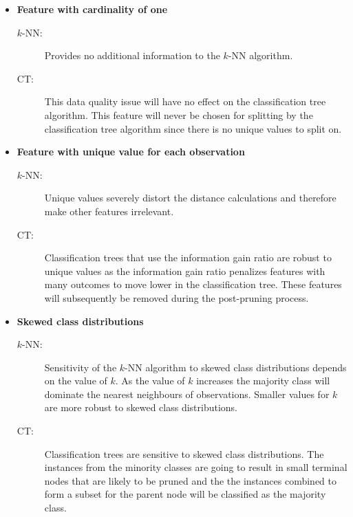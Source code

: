 \documentclass[conference]{IEEEtran}
\begin{document}
\begin{itemize}
		\item \textbf{Feature with cardinality of one}  
		\begin{description}
			\item [$k$-NN:] Provides no additional information to the $k$-NN algorithm.
			\item [CT:] This data quality issue will have no effect on the classification tree algorithm. This feature will never be chosen for splitting by the classification tree algorithm since there is no unique values to split on.
		\end{description}
		
		\item \textbf{Feature with unique value for each observation}  
		\begin{description}
			\item [$k$-NN:] Unique values severely distort the distance calculations and therefore make other features irrelevant.
			\item [CT:] Classification trees that use the information gain ratio are robust to unique values as the information gain ratio penalizes features with many outcomes to move lower in the classification tree. These features will subsequently be removed during the post-pruning process.
		\end{description}
		
		\item \textbf{Skewed class distributions}  
		\begin{description}
			\item [$k$-NN:] Sensitivity of the $k$-NN algorithm to skewed class distributions depends on the value of $k$. As the value of $k$ increases the majority class will dominate the nearest neighbours of observations. Smaller values for $k$ are more robust to skewed class distributions. 
			\item [CT:] Classification trees are sensitive to skewed class distributions. The instances from the minority classes are going to result in small terminal nodes that are likely to be pruned and the the instances combined to form a subset for the parent node will be classified as the majority class.
		\end{description}
	\end{itemize}
\end{document}
